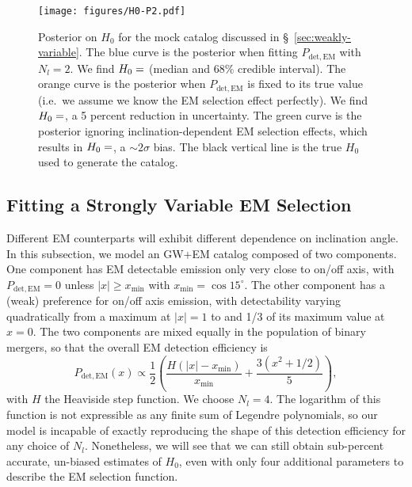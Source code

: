 \documentclass[modern]{aastex631}
\newcommand{\detected}{\mathrm{det}}
\newcommand{\EM}{\mathrm{EM}}
\begin{document}
\begin{figure}
    \texttt{[image: figures/H0-P2.pdf]}
    \caption{Posterior on $H_0$ for the mock catalog discussed in \S\,
    \ref{sec:weakly-variable}.  The blue curve is the posterior when fitting
    $P_{\detected,\EM}$ with $N_l = 2$.  We find $H_0 =
    \variable{output/H0-P2.txt}$ (median and 68\% credible interval).  The
    orange curve is the posterior when $P_{\detected,\EM}$ is fixed to its true
    value (i.e.\ we assume we know the EM selection effect perfectly).  We find
    $H_0 = \variable{output/H0-P2-fixed.txt}$, a 5 percent reduction in
    uncertainty.  The green curve is the posterior ignoring
    inclination-dependent EM selection effects, which results in $H_0 =
    \variable{output/H0-P2-nofit.txt}$, a $\sim 2\sigma$ bias.  The black
    vertical line is the true $H_0$ used to generate the catalog.}
    \label{fig:H0-P2}
\end{figure}

\subsection{Fitting a Strongly Variable EM Selection}
\label{sec:strongly-variable}

Different EM counterparts will exhibit different dependence on inclination
angle.  In this subsection, we model an GW+EM catalog composed of two
components.  One component has EM detectable emission only very close to on/off
axis, with $P_{\detected,\EM} = 0$ unless $|x| \geq x_\mathrm{min}$ with
$x_\mathrm{min} = \cos 15^\circ$.  The other component has a (weak) preference
for on/off axis emission, with detectability varying quadratically from a
maximum at $|x| = 1$ to and 1/3 of its maximum value at $x = 0$.  The two
components are mixed equally in the population of binary mergers, so that the
overall EM detection efficiency is 
\begin{equation}
    P_{\detected,\EM}(x) \propto \frac{1}{2} \left( \frac{H\left( |x| - x_\mathrm{min} \right)}{x_\mathrm{min}} + \frac{3 \left( x^2 + 1/2 \right)}{5} \right),
\end{equation}
with $H$ the Heaviside step function.  We choose $N_l = 4$.  The logarithm of
this function is not expressible as any finite sum of Legendre polynomials, so
our model is incapable of exactly reproducing the shape of this detection
efficiency for any choice of $N_l$.  Nonetheless, we will see that we can still
obtain sub-percent accurate, un-biased estimates of $H_0$, even with only four
additional parameters to describe the EM selection function.
\end{document}
